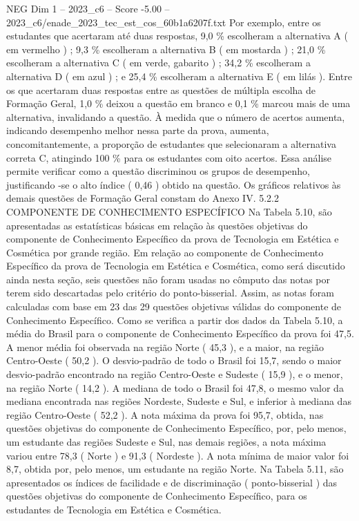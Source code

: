 \begin{textsample}{NEG Dim 1 – 2023\_c6 – Score -5.00 – 2023\_c6/enade\_2023\_tec\_est\_cos\_60b1a6207f.txt}
Por exemplo, entre os estudantes que acertaram até duas respostas, 9,0 \% escolheram a alternativa A ( em vermelho ) ; 9,3 \% escolheram a alternativa B ( em mostarda ) ; 21,0 \% escolheram a alternativa C ( em verde, gabarito ) ; 34,2 \% escolheram a alternativa D ( em azul ) ; e 25,4 \% escolheram a alternativa E ( em lilás ).
Entre os que acertaram duas respostas entre as questões de múltipla escolha de Formação Geral, 1,0 \% deixou a questão em branco e 0,1 \% marcou mais de uma alternativa, invalidando a questão.
À medida que o número de acertos aumenta, indicando desempenho melhor nessa parte da prova, aumenta, concomitantemente, a proporção de estudantes que selecionaram a alternativa correta C, atingindo 100 \% para os estudantes com oito acertos.
Essa análise permite verificar como a questão discriminou os grupos de desempenho, justificando -se o alto índice ( 0,46 ) obtido na questão.
Os gráficos relativos às demais questões de Formação Geral constam do Anexo IV. 5.2.2 COMPONENTE DE CONHECIMENTO ESPECÍFICO Na Tabela 5.10, são apresentadas as estatísticas básicas em relação às questões objetivas do componente de Conhecimento Específico da prova de Tecnologia em Estética e Cosmética por grande região.
Em relação ao componente de Conhecimento Específico da prova de Tecnologia em Estética e Cosmética, como será discutido ainda nesta seção, seis questões não foram usadas no cômputo das notas por terem sido descartadas pelo critério do ponto-bisserial.
Assim, as notas foram calculadas com base em 23 das 29 questões objetivas válidas do componente de Conhecimento Específico.
Como se verifica a partir dos dados da Tabela 5.10, a média do Brasil para o componente de Conhecimento Específico da prova foi 47,5.
A menor média foi observada na região Norte ( 45,3 ), e a maior, na região Centro-Oeste ( 50,2 ).
O desvio-padrão de todo o Brasil foi 15,7, sendo o maior desvio-padrão encontrado na região Centro-Oeste e Sudeste ( 15,9 ), e o menor, na região Norte ( 14,2 ).
A mediana de todo o Brasil foi 47,8, o mesmo valor da mediana encontrada nas regiões Nordeste, Sudeste e Sul, e inferior à mediana das região Centro-Oeste ( 52,2 ).
A nota máxima da prova foi 95,7, obtida, nas questões objetivas do componente de Conhecimento Específico, por, pelo menos, um estudante das regiões Sudeste e Sul, nas demais regiões, a nota máxima variou entre 78,3 ( Norte ) e 91,3 ( Nordeste ).
A nota mínima de maior valor foi 8,7, obtida por, pelo menos, um estudante na região Norte.
Na Tabela 5.11, são apresentados os índices de facilidade e de discriminação ( ponto-bisserial ) das questões objetivas do componente de Conhecimento Específico, para os estudantes de Tecnologia em Estética e Cosmética.

\end{textsample}
